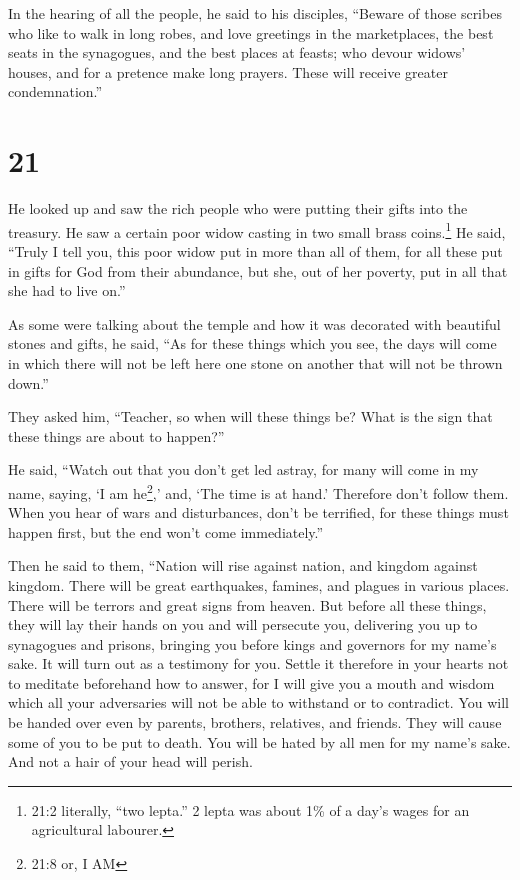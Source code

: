  In the hearing of all the people, he said to his
disciples,  ``Beware of those scribes who like to walk in
long robes, and love greetings in the marketplaces, the best seats in
the synagogues, and the best places at feasts;  who devour
widows' houses, and for a pretence make long prayers. These will receive
greater condemnation.''

\hypertarget{section-20}{%
\section{21}\label{section-20}}

 He looked up and saw the rich people who were putting their
gifts into the treasury.  He saw a certain poor widow
casting in two small brass coins.\footnote{21:2 literally, ``two
  lepta.'' 2 lepta was about 1\% of a day's wages for an agricultural
  labourer.}  He said, ``Truly I tell you, this poor widow
put in more than all of them,  for all these put in gifts
for God from their abundance, but she, out of her poverty, put in all
that she had to live on.''

 As some were talking about the temple and how it was
decorated with beautiful stones and gifts, he said,  ``As
for these things which you see, the days will come in which there will
not be left here one stone on another that will not be thrown down.''

 They asked him, ``Teacher, so when will these things be?
What is the sign that these things are about to happen?''

 He said, ``Watch out that you don't get led astray, for
many will come in my name, saying, `I am he\footnote{21:8 or, I AM},'
and, `The time is at hand.' Therefore don't follow them. 
When you hear of wars and disturbances, don't be terrified, for these
things must happen first, but the end won't come immediately.''

 Then he said to them, ``Nation will rise against nation,
and kingdom against kingdom.  There will be great
earthquakes, famines, and plagues in various places. There will be
terrors and great signs from heaven.  But before all these
things, they will lay their hands on you and will persecute you,
delivering you up to synagogues and prisons, bringing you before kings
and governors for my name's sake.  It will turn out as a
testimony for you.  Settle it therefore in your hearts not
to meditate beforehand how to answer,  for I will give you
a mouth and wisdom which all your adversaries will not be able to
withstand or to contradict.  You will be handed over even
by parents, brothers, relatives, and friends. They will cause some of
you to be put to death.  You will be hated by all men for
my name's sake.  And not a hair of your head will perish.

